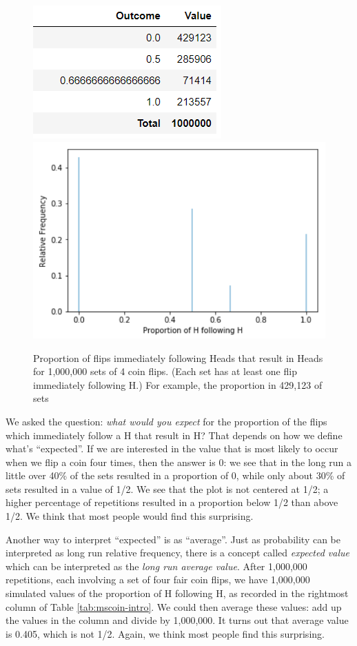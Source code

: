 \documentclass[
]{book}
\theoremstyle{definition}
\theoremstyle{definition}
\theoremstyle{definition}
\theoremstyle{remark}
\begin{document}
\begin{figure}
\includegraphics[width=0.5\linewidth]{_graphics/mscoin-intro-table} \includegraphics[width=0.5\linewidth]{_graphics/mscoin-intro-plot} \caption{Proportion of flips immediately following Heads that result in Heads for 1,000,000 sets of 4 coin flips. (Each set has at least one flip immediately following H.) For example, the proportion in 429,123 of sets}\label{fig:ms-coin-intro-plot}
\end{figure}

We asked the question: \emph{what would you expect} for the proportion of the flips which immediately follow a H that result in H? That depends on how we define what's ``expected''. If we are interested in the value that is most likely to occur when we flip a coin four times, then the answer is 0: we see that in the long run a little over 40\% of the sets resulted in a proportion of 0, while only about 30\% of sets resulted in a value of 1/2. We see that the plot is not centered at 1/2; a higher percentage of repetitions resulted in a proportion below 1/2 than above 1/2. We think that most people would find this surprising.

Another way to interpret ``expected'' is as ``average''. Just as probability can be interpreted as long run relative frequency, there is a concept called \emph{expected value} which can be interpreted as the \emph{long run average value}. After 1,000,000 repetitions, each involving a set of four fair coin flips, we have 1,000,000 simulated values of the proportion of H following H, as recorded in the rightmost column of Table \ref{tab:mscoin-intro}. We could then average these values: add up the values in the column and divide by 1,000,000. It turns out that average value is 0.405, which is not 1/2. Again, we think most people find this surprising.
\end{document}

